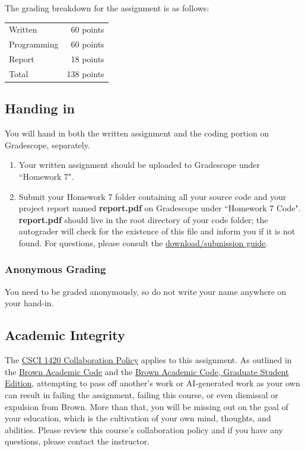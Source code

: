 \documentclass{article}
\begin{document}
The grading breakdown for the assignment is as follows:
\begin{center}
\begin{tabular}{| l | r |}
    \hline
    Written & 60 points\\
	Programming & 60 points \\
	Report & 18 points \\
	\hline
	Total & 138 points \\
	\hline
\end{tabular}
\end{center}


\subsection*{Handing in}
You will hand in both the written assignment and the coding portion on Gradescope, separately. 

\begin{enumerate}
    \item Your written assignment should be uploaded to Gradescope under ``Homework 7". 
    \item Submit your Homework 7 folder containing all your source code and your project report named \textbf{report.pdf} on Gradescope under ``Homework 7 Code". \textbf{report.pdf} should live in the root directory of your code folder; the autograder will check for the existence of this file and inform you if it is not found. For questions, please consult the \href{https://docs.google.com/document/d/1dYim__KVuE9nZj7RBWr9Mw-S6w6EjeFBbSBDxWWWJFA/edit?usp=sharing}{download/submission guide}.
\end{enumerate}


\subsubsection*{Anonymous Grading}
You need to be graded anonymously, so do not write your name anywhere on your hand-in. 


\subsection*{Academic Integrity}
The \href{https://docs.google.com/document/d/1V2w_oecqWRg0Zb9IWdG-5NzGnYnX55G5SG0Pf5jD0N4/edit?usp=sharing}{CSCI 1420 Collaboration Policy} applies to this assignment.
As outlined in the \href{https://college.brown.edu/design-your-education/academic-policies/academic-code}{Brown Academic Code} and the \href{https://graduateschool.brown.edu/academics-research/rules-regulations/academic-code}{Brown Academic Code, Graduate Student Edition}, attempting to pass off another's work or AI-generated work as your own can result in failing the assignment, failing this course, or even dismissal or expulsion from Brown.  More than that, you will be missing out on the goal of your education, which is the cultivation of your own mind, thoughts, and abilities.  Please review this course's collaboration policy and if you have any questions, please contact the instructor.
\end{document}
